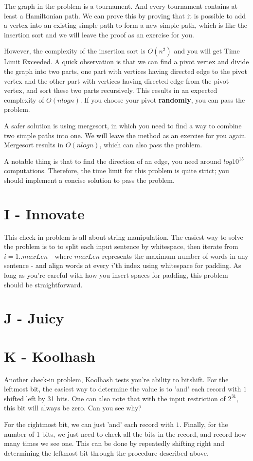 \documentclass{article}
\begin{document}
The graph in the problem is a tournament. And every tournament contains at least a Hamiltonian path. We can prove this by proving that it is possible to add a vertex into an existing simple path to form a new simple path, which is like the insertion sort and we will leave the proof as an exercise for you. 

\par
However, the complexity of the insertion sort is $O(n^2)$ and you will get Time Limit Exceeded. A quick observation is that we can find a pivot vertex and divide the graph into two parts, one part with vertices having directed edge to the pivot vertex and the other part with vertices having directed edge from the pivot vertex, and sort these two parts recursively. This results in an expected complexity of $O(nlogn)$. If you choose your pivot \textbf{randomly}, you can pass the problem.

\par
A safer solution is using mergesort, in which you need to find a way to combine two simple paths into one. We will leave the method as an exercise for you again. Mergesort results in $O(nlogn)$, which can also pass the problem.

\par
A notable thing is that to find the direction of an edge, you need around $log10^{15}$ computations. Therefore, the time limit for this problem is quite strict; you should implement a concise solution to pass the problem.

\section*{I - Innovate}
This check-in problem is all about string manipulation. The easiest way to solve the problem is to to split each input sentence by whitespace, then iterate from $i=1..maxLen$ - where $maxLen$ represents the maximum number of words in any sentence - and align words at every $i$'th index using whitespace for padding. As long as you're careful with how you insert spaces for padding, this problem should be straightforward.

\section*{J - Juicy}

\section*{K - Koolhash}
Another check-in problem, Koolhash tests you're ability to bitshift. For the leftmost bit, the easiest way to determine the value is to 'and' each record with $1$ shifted left by 31 bits. One can also note that with the input restriction of $2^{31}$, this bit will always be zero. Can you see why?

\par
For the rightmost bit, we can just 'and' each record with $1$. Finally, for the number of 1-bits, we just need to check all the bits in the record, and record how many times we see one. This can be done by repeatedly shifting right and determining the leftmost bit through the procedure described above.
\end{document}
